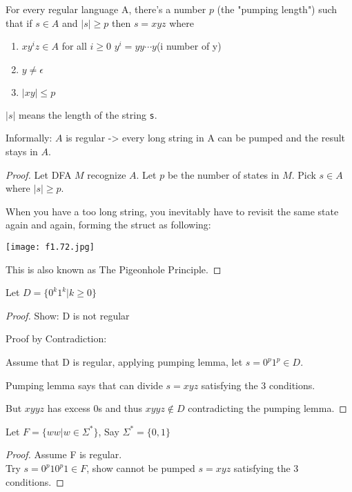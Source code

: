 \begin{lemma}
    For every regular language A, there's a number \(p\) (the "pumping length") such that  
    if \(s \in A\) and \(|s| \geq p\) then \(s = xyz\) where 
    \begin{enumerate}
        \item \(xy^iz \in A\) for all \(i \geq 0\) \quad \(y^i = yy\cdots y\)(i number of y)
        \item \(y \neq \epsilon\)
        \item \(|xy| \leq p\)     
    \end{enumerate}
    \begin{remark}
        \(|s|\) means the length of the string \verb|s|. 
    \end{remark}
    \hfill \break
    Informally: \(A\) is regular -> every long string in A can be pumped and the result stays in \(A\).  
\end{lemma}
\begin{proof}
    Let DFA \(M\) recognize \(A\). Let \(p\) be the number of states in \(M\). Pick \(s \in A\) where \(|s| \geq p\).      

    When you have a too long string, you inevitably have to revisit the same state again and again, forming the struct as following:

    \texttt{[image: f1.72.jpg]}

    This is also known as The Pigeonhole Principle.
\end{proof}

\begin{eg}
    Let \(D = \{ 0^k1^k | k \geq 0 \} \) 
\end{eg}
\begin{proof}
    Show: D is not regular

    Proof by Contradiction:

    Assume that D is regular, applying pumping lemma, let \(s = 0^p1^p \in D\). 

    Pumping lemma says that can divide \(s = xyz\) satisfying the 3 conditions.

    But \(xyyz\) has excess 0s and thus \(xyyz \notin D\) contradicting the pumping lemma.  
\end{proof}

\begin{eg}
    Let \(F = \{ ww| w \in \Sigma^* \} \), Say \(\Sigma^* = \{ 0, 1 \} \)  
\end{eg}
\begin{proof}
    Assume F is regular.\\
    Try \(s = 0^p10^p1 \in F\), show cannot be pumped \(s = xyz\) satisfying the 3 conditions.  
\end{proof}

